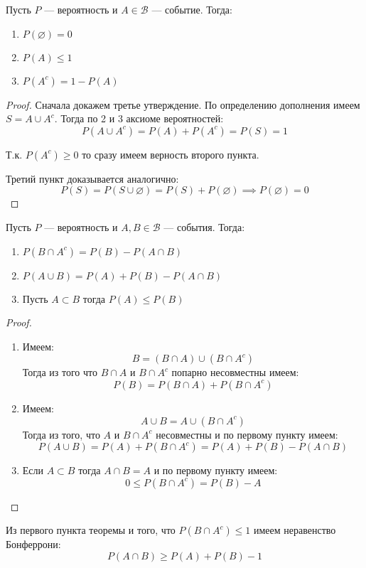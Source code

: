 \documentclass[document]{subfiles}
\begin{document}
\begin{theorem}
    Пусть $P$ --- вероятность и $A \in \mathcal{B}$ --- событие. Тогда:
    \begin{enumerate}
        \item $P(\varnothing) = 0$
        \item $P(A) \le 1$
        \item $P(A^c) = 1 - P(A)$
    \end{enumerate}
\end{theorem}
\begin{proof}
    Сначала докажем третье утверждение. По определению дополнения имеем $S = A \cup A^c$. Тогда по 2 и 3 аксиоме вероятностей:
    \[P(A \cup A^c) = P(A) + P(A^c) = P(S) = 1\]

    Т.к. $P(A^c)\ge 0 $ то сразу имеем верность второго пункта.

    Третий пункт доказывается аналогично:
    \[P(S) = P(S \cup \varnothing) = P(S) + P(\varnothing) \implies P(\varnothing) = 0\]
\end{proof}

\begin{theorem}
    Пусть $P$ --- вероятность и $A,B \in \mathcal{B}$ --- события. Тогда:
    \begin{enumerate}
        \item $P(B \cap A^c) = P(B) - P(A \cap B)$
        \item $P(A \cup B) = P(A) + P(B) - P(A \cap B)$
        \item Пусть $A \subset B$ тогда $P(A) \le P(B)$
    \end{enumerate}
\end{theorem}
\begin{proof}
    \begin{enumerate}
        \item Имеем:
        \[B = (B\cap A) \cup (B \cap A^c)\]
        Тогда из того что $B \cap A$ и $B \cap A^c$ попарно несовместны имеем:
            \[P(B) = P(B \cap A) + P(B \cap A^c)\]
        \item Имеем:
            \[A \cup B = A \cup (B \cap A^c)\]
            Тогда из того, что $A$ и $B \cap A^c$ несовместны и по первому пункту имеем:
            \[P(A \cup B) = P(A) + P(B \cap A^c) = P(A) + P(B) - P(A \cap B)\]
        \item Если $A \subset B$ тогда $A \cap B = A$ и по первому пункту имеем:
            \[0 \le P(B \cap A^c) = P(B) - A\]
    \end{enumerate}
\end{proof}
\begin{definition}
    Из первого пункта теоремы и того, что $P(B \cap A^c) \le 1$ имеем неравенство Бонферрони:
    \[P(A \cap B) \ge P(A) + P(B) - 1\]
\end{definition}
\end{document}
